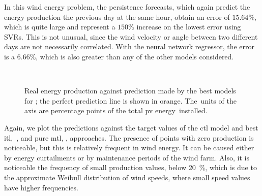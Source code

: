 %
In this wind energy problem, the persistence forecasts, which again predict the energy production the previous day at the same hour, obtain an error of $15.64\%$, which is quite large and represent a $150\%$ increase on the lowest error using SVRs. This is not unusual, since the wind velocity or angle between two different days are not necessarily correlated.
%
With the neural network regressor, the error is a $6.66\%$, which is also greater than any of the other models considered.

\begin{figure}[t!]
    \centering%
    \quad%
    \quad%
    \\
 \caption{\label{fig:stv_best_plots} Real energy production against prediction made by the best models for ; the perfect prediction line is shown in orange. The~units of the axis are percentage points of the total \acrshort{pv} energy~installed.}
 \end{figure}

%
Again, we plot the predictions against the target values of the \acrshort{ctl} model and best \acrshort{itl},~, and pure \acrshort{mtl}, , approaches.
The presence of points with zero production is noticeable, but this is relatively frequent in wind energy. It can be caused either by energy curtailments or by maintenance periods of the wind farm.
Also, it is noticeable the frequency of small production values, below \SI{20}{\percent}, which is due to the approximate Weibull distribution of wind speeds, where small speed values have higher frequencies. 








